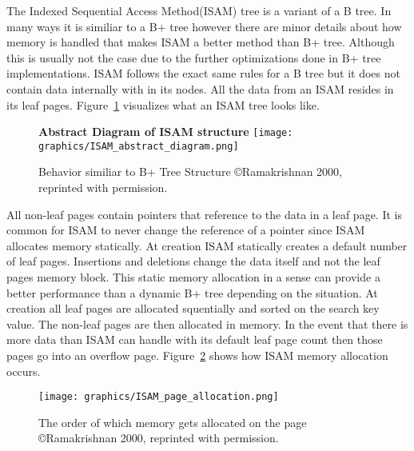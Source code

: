 \documentclass[letterpaper, 12pt]{article}
\begin{document}
The Indexed Sequential Access Method(ISAM) tree is a variant of a B tree. In many ways it is similiar to a B+ tree 
however there are minor details about how memory is handled that makes ISAM a better method than B+ tree. 
Although this is usually not the case due to the further optimizations done in B+ tree implementations. 
ISAM follows the exact same rules for a B tree but it does not contain data internally with in its nodes. 
All the data from an ISAM resides in its leaf pages. Figure~\ref{fig:isam_visual} visualizes what an ISAM tree
looks like.
\par\vspace{\baselineskip}

\begin{figure}[H]
  \centering
  \textbf{Abstract Diagram of ISAM structure}
  \texttt{[image: graphics/ISAM\_abstract\_diagram.png]}
  \caption{Behavior similiar to B+ Tree Structure \copyright Ramakrishnan 2000, reprinted with permission.\cite{ramakrishnan2000database}}
  \label{fig:isam_visual}
\end{figure}

All non-leaf pages contain pointers that reference to the data in a leaf page. It is common for
ISAM to never change the reference of a pointer since ISAM allocates memory statically. At creation
ISAM statically creates a default number of leaf pages. Insertions and deletions change the data
itself and not the leaf pages memory block. This static memory allocation in a sense can
provide a better performance than a dynamic B+ tree depending on the situation. At creation all
leaf pages are allocated squentially and sorted on the search key value. The non-leaf pages
are then allocated in memory. In the event that there is more data than ISAM can handle with its
default leaf page count then those pages go into an overflow page. Figure~\ref{fig:isam_memory} shows 
how ISAM memory allocation occurs.
\par\vspace{\baselineskip}

\begin{figure}[H]
  \centering
  \texttt{[image: graphics/ISAM\_page\_allocation.png]}
  \caption{The order of which memory gets allocated on the page \newline \copyright Ramakrishnan 2000, 
  reprinted with permission.\cite{ramakrishnan2000database}}
  \label{fig:isam_memory}
\end{figure}
\end{document}
